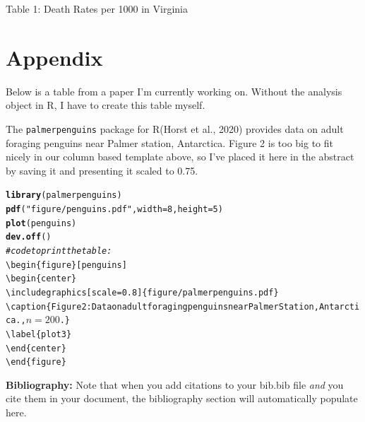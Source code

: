 \documentclass{article}\usepackage[]{graphicx}\usepackage[]{xcolor}
\makeatletter
\newcommand{\hlsng}[1]{\textcolor[rgb]{0.192,0.494,0.8}{#1}}%
\newcommand{\hlcom}[1]{\textcolor[rgb]{0.678,0.584,0.686}{\textit{#1}}}%
\newcommand{\hlkwd}[1]{\textcolor[rgb]{0.737,0.353,0.396}{\textbf{#1}}}%
\newenvironment{kframe}{%
 \def\at@end@of@kframe{}%
 \ifinner\ifhmode%
  \def\at@end@of@kframe{\end{minipage}}%
  \begin{minipage}{\columnwidth}%
 \fi\fi%
 \def\FrameCommand##1{\hskip\@totalleftmargin \hskip-\fboxsep
 \colorbox{shadecolor}{##1}\hskip-\fboxsep
     \hskip-\linewidth \hskip-\@totalleftmargin \hskip\columnwidth}%
 \MakeFramed {\advance\hsize-\width
   \@totalleftmargin\z@ \linewidth\hsize
   \@setminipage}}%
 {\par\unskip\endMakeFramed%
 \at@end@of@kframe}
\newenvironment{knitrout}{}{} %
\makeatother
\begin{document}
\begin{multicols}{2}
\indent Table 1: Death Rates per 1000 in Virginia
\newpage
\onecolumn
\section{Appendix}
Below is a table from a paper I’m currently working on. Without the analysis object in R, I have to create this table myself.

\indent The \texttt{palmerpenguins} package for R(Horst et al., 2020) provides data on adult foraging penguins near Palmer station, Antarctica. Figure 2 is too big to fit nicely in our column based template above, so I've placed it here in the abstract by saving it and presenting it scaled to 0.75.
\begin{knitrout}
\color{fgcolor}\begin{kframe}
\begin{alltt}
\hlkwd{library}(palmerpenguins)
\hlkwd{pdf}(\hlsng{"figure/penguins.pdf"}, width=8,height=5)
\hlkwd{plot}(penguins)
\hlkwd{dev.off}()
\hlcom{#code to print the table:}
\textbackslash{}begin\{figure\}[penguins]
\textbackslash{}begin\{center\}
\textbackslash{}includegraphics[scale=0.8]\{figure/palmerpenguins.pdf\}
\textbackslash{}caption\{Figure 2: Data on adult foraging penguins near Palmer Station, Antarctica., $n=200$.\}
\textbackslash{}label\{plot3\}
\textbackslash{}end\{center\}
\textbackslash{}end\{figure\}
\end{alltt}


{\ttfamily\noindent\bfseries{}}\end{kframe}
\end{knitrout}
\vspace{2em}

\noindent\textbf{Bibliography:} Note that when you add citations to your bib.bib file \emph{and}
you cite them in your document, the bibliography section will automatically populate here.

\begin{tiny}

\end{tiny}
\end{multicols}
\end{document}
